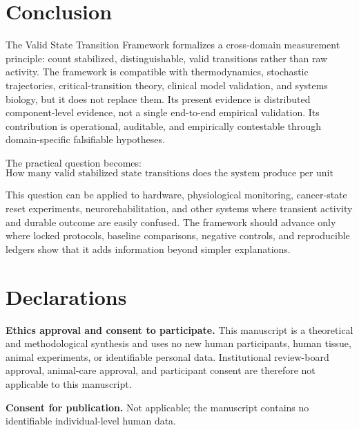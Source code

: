 \documentclass[11pt,a4paper]{article}
\newcommand{\1}{\mathbf{1}}
\begin{document}
\section{Conclusion}

The Valid State Transition Framework formalizes a cross-domain measurement principle: count stabilized, distinguishable, valid transitions rather than raw activity. The framework is compatible with thermodynamics, stochastic trajectories, critical-transition theory, clinical model validation, and systems biology, but it does not replace them. Its present evidence is distributed component-level evidence, not a single end-to-end empirical validation. Its contribution is operational, auditable, and empirically contestable through domain-specific falsifiable hypotheses.

The practical question becomes:
\[
  \text{How many valid stabilized state transitions does the system produce per unit cost?}
\]

This question can be applied to hardware, physiological monitoring, cancer-state reset experiments, neurorehabilitation, and other systems where transient activity and durable outcome are easily confused. The framework should advance only where locked protocols, baseline comparisons, negative controls, and reproducible ledgers show that it adds information beyond simpler explanations.

\section*{Declarations}

\textbf{Ethics approval and consent to participate.} This manuscript is a theoretical and methodological synthesis and uses no new human participants, human tissue, animal experiments, or identifiable personal data. Institutional review-board approval, animal-care approval, and participant consent are therefore not applicable to this manuscript.

\textbf{Consent for publication.} Not applicable; the manuscript contains no identifiable individual-level human data.
\end{document}
